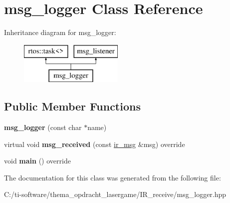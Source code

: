 \hypertarget{classmsg__logger}{}\section{msg\+\_\+logger Class Reference}
\label{classmsg__logger}
Inheritance diagram for msg\+\_\+logger\+:\begin{figure}[H]
\begin{center}
\leavevmode
\includegraphics[height=2.000000cm]{classmsg__logger}
\end{center}
\end{figure}
\subsection*{Public Member Functions}
\begin{DoxyCompactItemize}
\item 
\mbox{\label{classmsg__logger_a3ae26749c728559cb363631a7810f014}} 
{\bfseries msg\+\_\+logger} (const char $\ast$name)
\item 
\mbox{\label{classmsg__logger_a1d6398b619717cccc6e125a660d6ad30}} 
virtual void {\bfseries msg\+\_\+received} (const \mbox{\hyperlink{structir__msg}{ir\+\_\+msg}} \&msg) override
\item 
\mbox{\label{classmsg__logger_ac674c87e969c7a22f483c809bf868460}} 
void {\bfseries main} () override
\end{DoxyCompactItemize}


The documentation for this class was generated from the following file\+:\begin{DoxyCompactItemize}
\item 
C\+:/ti-\/software/thema\+\_\+opdracht\+\_\+lasergame/\+I\+R\+\_\+receive/msg\+\_\+logger.\+hpp\end{DoxyCompactItemize}
